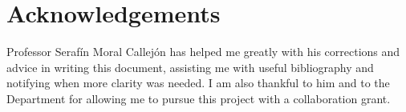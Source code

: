 \documentclass[
12pt, %
english, %
singlespacing, %
headsepline, %
]{MastersDoctoralThesis} %
\author{Pedro Bonilla Nadal} %
\theoremstyle{definition}
\begin{document}
\frontmatter %





\cleardoublepage




\pagestyle{thesis}
{
  \hypersetup{hidelinks}
  \setcounter{tocdepth}{2}
  \tableofcontents

}



               

\begin{otherlanguage}{spanish}
                      
\end{otherlanguage}






\mainmatter %





 


 










%
%
\section*{Acknowledgements}
Professor Serafín Moral Callejón has helped me greatly with his corrections and advice in writing this document, assisting me with useful bibliography and notifying when more clarity was needed. I am also thankful to him and to the Department for allowing me to pursue this project with a collaboration grant.\\
\end{document}
